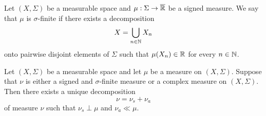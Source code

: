\begin{definition}
Let $(X,\Sigma)$ be a measurable space and $\mu:\Sigma \rightarrow \overline{{\mathbb R}}$ be a signed measure. We say that $\mu$ is $\sigma$-finite if there exists a decomposition
$$X = \bigcup_{n\in {\mathbb N}}X_n$$
onto pairwise disjoint elements of $\Sigma$ such that $\mu(X_n)\in {\mathbb R}$ for every $n\in {\mathbb N}$.
\end{definition}

\begin{theorem}\label{theorem:lebesguedecomposition}
Let $(X,\Sigma)$ be a measurable space and let $\mu$ be a measure on $(X,\Sigma)$. Suppose that $\nu$ is either a signed and $\sigma$-finite measure or a complex measure on $(X,\Sigma)$. Then there exists a unique decomposition 
$$\nu = \nu_s + \nu_a$$
of measure $\nu$ such that $\nu_s \perp \mu$ and $\nu_a \ll \mu$.
\end{theorem}
